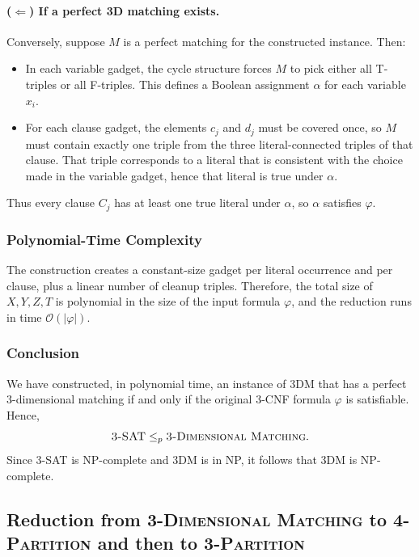 \documentclass[9pt]{extarticle}
\begin{document}
\paragraph{($\Leftarrow$) If a perfect 3D matching exists.}

Conversely, suppose \(M\) is a perfect matching for the constructed instance.
Then:
\begin{itemize}
    \item In each variable gadget, the cycle structure forces \(M\) to pick
          either all T-triples or all F-triples.  This defines a Boolean
          assignment \(\alpha\) for each variable \(x_i\).
    \item For each clause gadget, the elements \(c_j\) and \(d_j\) must be
          covered once, so \(M\) must contain exactly one triple from the three
          literal-connected triples of that clause.  That triple corresponds to
          a literal that is consistent with the choice made in the variable
          gadget, hence that literal is true under \(\alpha\).
\end{itemize}
Thus every clause \(C_j\) has at least one true literal under \(\alpha\), so
\(\alpha\) satisfies \(\varphi\).

\subsubsection*{Polynomial-Time Complexity}

The construction creates a constant-size gadget per literal occurrence and per
clause, plus a linear number of cleanup triples.  Therefore, the total size of
\(X,Y,Z,T\) is polynomial in the size of the input formula \(\varphi\), and the
reduction runs in time \(\mathcal{O}(|\varphi|)\).

\subsubsection*{Conclusion}

We have constructed, in polynomial time, an instance of \textsc{3DM} that has a
perfect 3-dimensional matching if and only if the original 3-CNF formula
\(\varphi\) is satisfiable.  Hence,
\[
    \textsc{3-SAT} \le_p \textsc{3-Dimensional Matching}.
\]
Since \textsc{3-SAT} is NP-complete and \textsc{3DM} is in NP, it follows that
\textsc{3DM} is NP-complete.

\subsection{Reduction from \textsc{3-Dimensional Matching} to \textsc{4-Partition} and then to \textsc{3-Partition}}
\end{document}
